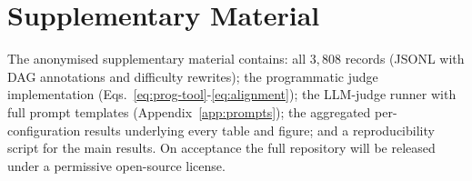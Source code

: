 \section{Supplementary Material}
\label{sec:release}

The anonymised supplementary material contains: all $3{,}808$ records (JSONL with DAG annotations and difficulty rewrites); the programmatic judge implementation (Eqs.~\ref{eq:prog-tool}-\ref{eq:alignment}); the LLM-judge runner with full prompt templates (Appendix~\ref{app:prompts}); the aggregated per-configuration results underlying every table and figure; and a reproducibility script for the main results. On acceptance the full repository will be released under a permissive open-source license.